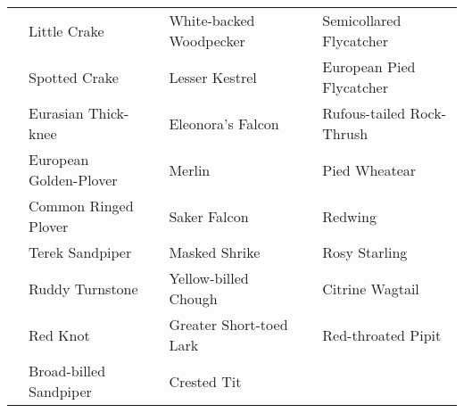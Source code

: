 \documentclass{article}
\begin{document}
\begin{center}
\begin{tabularx}{\textwidth}{cXcXcX}
\underline{\hspace{3ex}} 	 &Little Crake 	 &\underline{\hspace{3ex}} 	 &White-backed Woodpecker 	 &\underline{\hspace{3ex}} 	 &Semicollared Flycatcher \\ 
\underline{\hspace{3ex}} 	 &Spotted Crake 	 &\underline{\hspace{3ex}} 	 &Lesser Kestrel 	 &\underline{\hspace{3ex}} 	 &European Pied Flycatcher \\ 
\underline{\hspace{3ex}} 	 &Eurasian Thick-knee 	 &\underline{\hspace{3ex}} 	 &Eleonora's Falcon 	 &\underline{\hspace{3ex}} 	 &Rufous-tailed Rock-Thrush \\ 
\underline{\hspace{3ex}} 	 &European Golden-Plover 	 &\underline{\hspace{3ex}} 	 &Merlin 	 &\underline{\hspace{3ex}} 	 &Pied Wheatear \\ 
\underline{\hspace{3ex}} 	 &Common Ringed Plover 	 &\underline{\hspace{3ex}} 	 &Saker Falcon 	 &\underline{\hspace{3ex}} 	 &Redwing \\ 
\underline{\hspace{3ex}} 	 &Terek Sandpiper 	 &\underline{\hspace{3ex}} 	 &Masked Shrike 	 &\underline{\hspace{3ex}} 	 &Rosy Starling \\ 
\underline{\hspace{3ex}} 	 &Ruddy Turnstone 	 &\underline{\hspace{3ex}} 	 &Yellow-billed Chough 	 &\underline{\hspace{3ex}} 	 &Citrine Wagtail \\ 
\underline{\hspace{3ex}} 	 &Red Knot 	 &\underline{\hspace{3ex}} 	 &Greater Short-toed Lark 	 &\underline{\hspace{3ex}} 	 &Red-throated Pipit \\ 
\underline{\hspace{3ex}} 	 &Broad-billed Sandpiper 	 &\underline{\hspace{3ex}} 	 &Crested Tit 	 &\underline{\hspace{3ex}} 	 &\underline{\hfill} \\ 
\hline
\end{tabularx} 
\end{center}
\end{document}
